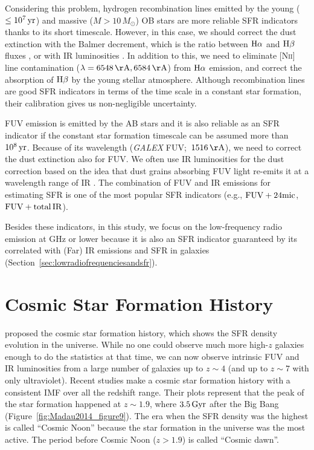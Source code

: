 Considering this problem, hydrogen recombination lines emitted by the young ($\leq 10^7\,\mathrm{yr}$) and massive ($M > 10\,M_{\odot}$) OB stars are more reliable SFR indicators thanks to its short timescale.
However, in this case, we should correct the dust extinction with the Balmer decrement, which is the ratio between $\mathrm{H\alpha}$ and $\mathrm{H\beta}$ fluxes \citep{Lequeux1981}, or with IR luminosities \citep{Kennicutt2009}.
In addition to this, we need to eliminate [N\textsc{ii}] line contamination ($\lambda = 6548\,\mr{\AA}, 6584\,\mr{\AA}$) from $\mathrm{H}\alpha$ emission, and correct the absorption of $\mathrm{H\beta}$ by the young stellar atmosphere.
Although recombination lines are good SFR indicators in terms of the time scale in a constant star formation, their calibration gives us non-negligible uncertainty.

FUV emission is emitted by the AB stars and it is also reliable as an SFR indicator if the constant star formation timescale can be assumed more than $10^8\,\mathrm{yr}$.
Because of its wavelength ({\it GALEX\/} FUV;~$1516\,\mr{\AA}$), we need to correct the dust extinction also for FUV\@.
We often use IR luminosities for the dust correction based on the idea that dust grains absorbing FUV light re-emits it at a wavelength range of IR \citep{Kennicutt1998, Murphy2011}.
The combination of FUV and IR emissions for estimating SFR is one of the most popular SFR indicators (e.g., $\mathrm{FUV + 24mic}$, $\mathrm{FUV + total\,IR}$).

Besides these indicators, in this study, we focus on the low-frequency radio emission at GHz or lower because it is also an SFR indicator guaranteed by its correlated with (Far) IR emissions and SFR in galaxies (Section~\ref{sec:lowradiofrequenciesandsfr}).





\section{Cosmic Star Formation History}\label{sec:cosmicstarformationhistory}

\citet{Tinsley1980} proposed the cosmic star formation history, which shows the SFR density evolution in the universe.
While no one could observe much more high-$z$ galaxies enough to do the statistics at that time, we can now observe intrinsic FUV and IR luminosities from a large number of galaxies up to $z \sim 4$ (and up to $z \sim 7$ with only ultraviolet).
    Recent studies \citep{Hopkins2006, Madau2014} make a cosmic star formation history with a consistent IMF over all the redshift range.
Their plots represent that the peak of the star formation happened at $z\sim1.9$, where $3.5\,\mathrm{Gyr}$ after the Big Bang (Figure~\ref{fig:Madau2014_figure9}).
The era when the SFR density was the highest is called ``Cosmic Noon'' because the star formation in the universe was the most active.
The period before Cosmic Noon ($z > 1.9$) is called  ``Cosmic dawn''.

